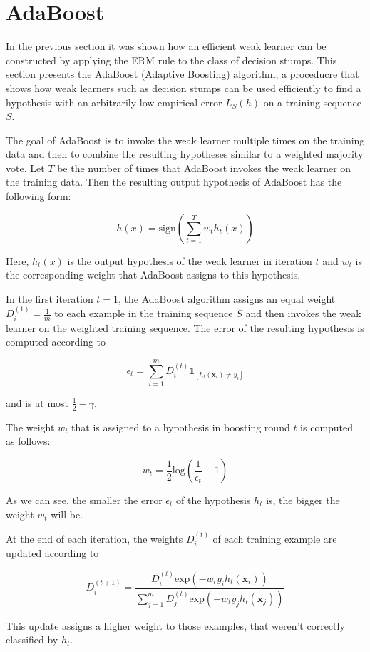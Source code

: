 \section{AdaBoost}
\label{sec:adaboost}

In the previous section it was shown how an efficient weak learner can be constructed by applying the ERM rule to
the class of decision stumps.
This section presents the AdaBoost (Adaptive Boosting) algorithm, a proceducre that shows 
how weak learners such as decision stumps can be
used efficiently to find a hypothesis with an arbitrarily low empirical error $L_S(h)$ on a training sequence $S$.

The goal of AdaBoost is to invoke the weak learner multiple times on the training data and then to combine
the resulting hypotheses similar to a weighted majority vote.
Let $T$ be the number of times that AdaBoost invokes the weak learner on the training data. Then the resulting
output hypothesis of AdaBoost has the following form:
\begin{linenomath*}
    $$
    h(x) = \text{sign}\left( \sum_{t=1}^T w_t h_t(x) \right)
    $$
\end{linenomath*}
Here, $h_t(x)$ is the output hypothesis of the weak learner in iteration $t$ and $w_t$ is the corresponding weight
that AdaBoost assigns to this hypothesis.

In the first iteration $t=1$, the AdaBoost algorithm assigns an equal weight $D_i^{(1)} = \frac{1}{m}$ to each example
in the training sequence $S$ and then invokes the weak learner on the weighted training sequence.
The error of the resulting hypothesis is computed according to
\begin{linenomath*}
    $$
    \epsilon_t = \sum_{i=1}^m D_i^{(t)} \mathds{1}_{\left[ h_t(\mathbf{x}_i) \neq y_i \right]}
    $$
\end{linenomath*}
and is at most $\frac{1}{2}-\gamma$.

The weight $w_t$ that is assigned to a hypothesis in boosting round $t$ is computed as follows:
\begin{linenomath*}
    $$
    w_t = \frac{1}{2} \text{log} \left( \frac{1}{\epsilon_t} - 1 \right)
    $$
\end{linenomath*}
As we can see, the smaller the error $\epsilon_t$ of the hypothesis $h_t$ is, the bigger the weight $w_t$ will be.

At the end of each iteration, the weights $D_i^{(t)}$ of each training example are updated according to
\begin{linenomath*}
    $$
    D_i^{(t+1)} = \frac{D_i^{(t)} \text{exp} \left( -w_t y_i h_t(\mathbf{x}_i) \right)}{
        \sum_{j=1}^m D_j^{(t)} \text{exp} \left( -w_t y_j h_t(\mathbf{x}_j) \right) }
    $$
\end{linenomath*}
This update assigns a higher weight to those examples, that weren't correctly classified by $h_t$.

